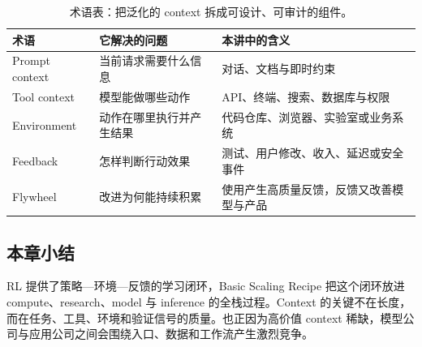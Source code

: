 \begin{table}[H]
\centering
\begin{tabular}{L{0.18\textwidth}L{0.32\textwidth}L{0.4\textwidth}}
\toprule
术语 & 它解决的问题 & 本讲中的含义 \\
\midrule
Prompt context & 当前请求需要什么信息 & 对话、文档与即时约束 \\
Tool context & 模型能做哪些动作 & API、终端、搜索、数据库与权限 \\
Environment & 动作在哪里执行并产生结果 & 代码仓库、浏览器、实验室或业务系统 \\
Feedback & 怎样判断行动效果 & 测试、用户修改、收入、延迟或安全事件 \\
Flywheel & 改进为何能持续积累 & 使用产生高质量反馈，反馈又改善模型与产品 \\
\bottomrule
\end{tabular}
\caption{术语表：把泛化的 context 拆成可设计、可审计的组件。}
\end{table}

\subsection{本章小结}

RL 提供了策略—环境—反馈的学习闭环，Basic Scaling Recipe 把这个闭环放进 compute、research、model 与 inference 的全栈过程。Context 的关键不在长度，而在任务、工具、环境和验证信号的质量。也正因为高价值 context 稀缺，模型公司与应用公司之间会围绕入口、数据和工作流产生激烈竞争。


